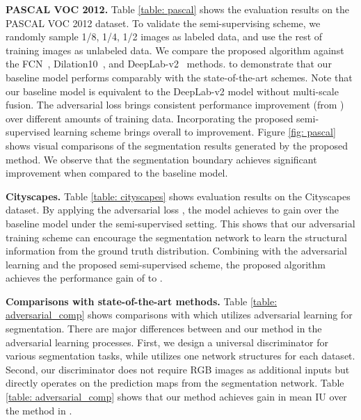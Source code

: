 \documentclass{bmvc2k}
\begin{document}
	\vspace{-2mm}		
	{\flushleft \bf PASCAL VOC 2012.}
Table \ref{table: pascal} shows the evaluation results on the PASCAL VOC 2012 dataset.
To validate the semi-supervising scheme, we randomly sample 1/8, 1/4, 1/2 images as labeled data, and use the rest of training images as unlabeled data.
We compare the proposed algorithm against the FCN~\cite{fcn}, Dilation10~\cite{dilated}, and DeepLab-v2~\cite{deeplab} methods.
	to demonstrate that our baseline model performs comparably with the state-of-the-art schemes.
Note that our baseline model is equivalent to the DeepLab-v2 model without multi-scale fusion.
The adversarial loss brings consistent performance improvement (from ) over different amounts of training data.
Incorporating the proposed semi-supervised learning scheme brings overall  to  improvement.
Figure \ref{fig: pascal} shows visual comparisons of the segmentation results generated by the proposed method. 
We observe that the segmentation boundary achieves significant improvement when compared to the baseline model.
	
	\vspace{-2mm}		
	{\flushleft \bf Cityscapes.}
Table \ref{table: cityscapes} shows evaluation results on the Cityscapes dataset.
By applying the adversarial loss , the model achieves  to  gain over the baseline model under the semi-supervised setting.
This shows that our adversarial training scheme can encourage the segmentation network to learn the structural information from the ground truth distribution.
Combining with  the adversarial learning and the proposed semi-supervised scheme, 
	the proposed algorithm achieves the performance gain of  to . 


	\vspace{-2mm}		
	{\flushleft \bf Comparisons with state-of-the-art methods.}
Table \ref{table: adversarial_comp} shows comparisons with \cite{luc2016semantic} which utilizes adversarial learning for segmentation. 
There are major differences between \cite{luc2016semantic} and our method
	in the adversarial learning processes. 
First, we design a universal discriminator for various segmentation tasks, while \cite{luc2016semantic} utilizes one network structures for each dataset.
Second, our discriminator does not require RGB images as additional inputs 
	but directly operates on the prediction maps from the segmentation network.
Table \ref{table: adversarial_comp} shows that our method achieves  gain in mean IU over the method in \cite{luc2016semantic}.
	
\end{document}
